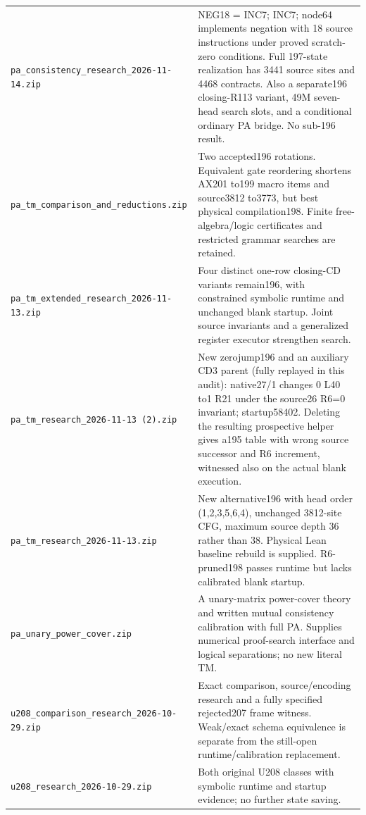 \begin{longtable}{p{}p{}}
\nolinkurl{pa_consistency_research_2026-11-14.zip} & NEG18 = INC7; INC7; node64 implements negation with 18 source instructions under proved scratch-zero conditions. Full 197-state realization has 3441 source sites and 4468 contracts. Also a separate196 closing-R113 variant, 49M seven-head search slots, and a conditional ordinary PA bridge. No sub-196 result.\\[4pt]
\nolinkurl{pa_tm_comparison_and_reductions.zip} & Two accepted196 rotations. Equivalent gate reordering shortens AX201 to199 macro items and source3812 to3773, but best physical compilation198. Finite free-algebra/logic certificates and restricted grammar searches are retained.\\[4pt]
\nolinkurl{pa_tm_extended_research_2026-11-13.zip} & Four distinct one-row closing-CD variants remain196, with constrained symbolic runtime and unchanged blank startup. Joint source invariants and a generalized register executor strengthen search.\\[4pt]
\nolinkurl{pa_tm_research_2026-11-13 (2).zip} & New zerojump196 and an auxiliary CD3 parent (fully replayed in this audit): native27/1 changes 0 L40 to1 R21 under the source26 R6=0 invariant; startup58402. Deleting the resulting prospective helper gives a195 table with wrong source successor and R6 increment, witnessed also on the actual blank execution.\\[4pt]
\nolinkurl{pa_tm_research_2026-11-13.zip} & New alternative196 with head order (1,2,3,5,6,4), unchanged 3812-site CFG, maximum source depth 36 rather than 38. Physical Lean baseline rebuild is supplied. R6-pruned198 passes runtime but lacks calibrated blank startup.\\[4pt]
\nolinkurl{pa_unary_power_cover.zip} & A unary-matrix power-cover theory and written mutual consistency calibration with full PA. Supplies numerical proof-search interface and logical separations; no new literal TM.\\[4pt]
\nolinkurl{u208_comparison_research_2026-10-29.zip} & Exact comparison, source/encoding research and a fully specified rejected207 frame witness. Weak/exact schema equivalence is separate from the still-open runtime/calibration replacement.\\[4pt]
\nolinkurl{u208_research_2026-10-29.zip} & Both original U208 classes with symbolic runtime and startup evidence; no further state saving.\\[4pt]
\bottomrule
\end{longtable}
\normalsize
